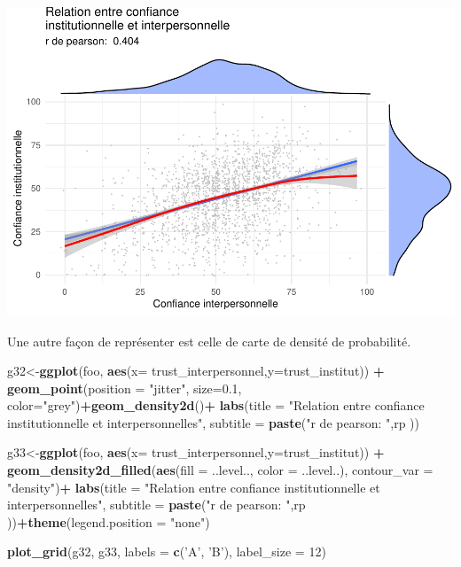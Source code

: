 \documentclass[
]{book}
\newenvironment{Shaded}{\begin{snugshade}}{\end{snugshade}}
\newcommand{\DataTypeTok}[1]{\textcolor[rgb]{0.13,0.29,0.53}{#1}}
\newcommand{\DecValTok}[1]{\textcolor[rgb]{0.00,0.00,0.81}{#1}}
\newcommand{\FloatTok}[1]{\textcolor[rgb]{0.00,0.00,0.81}{#1}}
\newcommand{\KeywordTok}[1]{\textcolor[rgb]{0.13,0.29,0.53}{\textbf{#1}}}
\newcommand{\NormalTok}[1]{#1}
\newcommand{\OperatorTok}[1]{\textcolor[rgb]{0.81,0.36,0.00}{\textbf{#1}}}
\newcommand{\StringTok}[1]{\textcolor[rgb]{0.31,0.60,0.02}{#1}}
\begin{document}
\includegraphics{bookdown-demo_files/figure-latex/415-1.pdf}

Une autre façon de représenter est celle de carte de densité de probabilité.

\begin{Shaded}
\begin{Highlighting}[]
\NormalTok{g32<-}\KeywordTok{ggplot}\NormalTok{(foo, }\KeywordTok{aes}\NormalTok{(}\DataTypeTok{x=}\NormalTok{ trust_interpersonnel,}\DataTypeTok{y=}\NormalTok{trust_institut)) }\OperatorTok{+}
\StringTok{  }\KeywordTok{geom_point}\NormalTok{(}\DataTypeTok{position =} \StringTok{"jitter"}\NormalTok{, }\DataTypeTok{size=}\FloatTok{0.1}\NormalTok{, }\DataTypeTok{color=}\StringTok{"grey"}\NormalTok{)}\OperatorTok{+}\KeywordTok{geom_density2d}\NormalTok{()}\OperatorTok{+}
\StringTok{  }\KeywordTok{labs}\NormalTok{(}\DataTypeTok{title =} \StringTok{"Relation entre confiance institutionnelle et interpersonnelles"}\NormalTok{, }\DataTypeTok{subtitle =} \KeywordTok{paste}\NormalTok{(}\StringTok{"r de pearson: "}\NormalTok{,rp ))}
  
\NormalTok{g33<-}\KeywordTok{ggplot}\NormalTok{(foo, }\KeywordTok{aes}\NormalTok{(}\DataTypeTok{x=}\NormalTok{ trust_interpersonnel,}\DataTypeTok{y=}\NormalTok{trust_institut)) }\OperatorTok{+}
\StringTok{  }\KeywordTok{geom_density2d_filled}\NormalTok{(}\KeywordTok{aes}\NormalTok{(}\DataTypeTok{fill =}\NormalTok{ ..level.., }\DataTypeTok{color =}\NormalTok{ ..level..),}
    \DataTypeTok{contour_var =} \StringTok{"density"}\NormalTok{)}\OperatorTok{+}
\StringTok{  }\KeywordTok{labs}\NormalTok{(}\DataTypeTok{title =} \StringTok{"Relation entre confiance institutionnelle et interpersonnelles"}\NormalTok{, }\DataTypeTok{subtitle =} \KeywordTok{paste}\NormalTok{(}\StringTok{"r de pearson: "}\NormalTok{,rp ))}\OperatorTok{+}\KeywordTok{theme}\NormalTok{(}\DataTypeTok{legend.position =} \StringTok{"none"}\NormalTok{)}
  

\KeywordTok{plot_grid}\NormalTok{(g32, g33, }\DataTypeTok{labels =} \KeywordTok{c}\NormalTok{(}\StringTok{'A'}\NormalTok{, }\StringTok{'B'}\NormalTok{), }\DataTypeTok{label_size =} \DecValTok{12}\NormalTok{)}
\end{Highlighting}
\end{Shaded}
\end{document}
